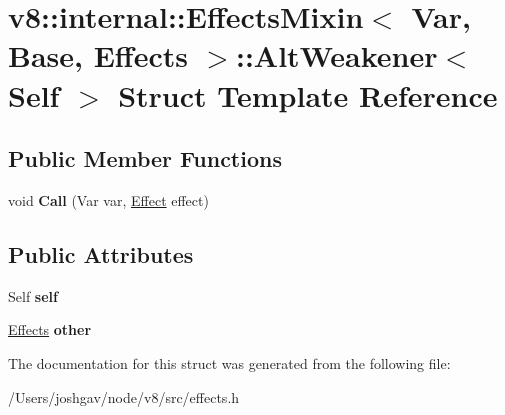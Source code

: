 \hypertarget{structv8_1_1internal_1_1_effects_mixin_1_1_alt_weakener}{}\section{v8\+:\+:internal\+:\+:Effects\+Mixin$<$ Var, Base, Effects $>$\+:\+:Alt\+Weakener$<$ Self $>$ Struct Template Reference}
\label{structv8_1_1internal_1_1_effects_mixin_1_1_alt_weakener}
\subsection*{Public Member Functions}
\begin{DoxyCompactItemize}
\item 
void {\bfseries Call} (Var var, \hyperlink{structv8_1_1internal_1_1_effect}{Effect} effect)\hypertarget{structv8_1_1internal_1_1_effects_mixin_1_1_alt_weakener_a651cd436a421f5b78abc43754e8309a3}{}\label{structv8_1_1internal_1_1_effects_mixin_1_1_alt_weakener_a651cd436a421f5b78abc43754e8309a3}

\end{DoxyCompactItemize}
\subsection*{Public Attributes}
\begin{DoxyCompactItemize}
\item 
Self {\bfseries self}\hypertarget{structv8_1_1internal_1_1_effects_mixin_1_1_alt_weakener_ae73da3655748ec9da62f755efd66633a}{}\label{structv8_1_1internal_1_1_effects_mixin_1_1_alt_weakener_ae73da3655748ec9da62f755efd66633a}

\item 
\hyperlink{classv8_1_1internal_1_1_effects}{Effects} {\bfseries other}\hypertarget{structv8_1_1internal_1_1_effects_mixin_1_1_alt_weakener_adde1918061d0bb8bd6148becfeef5e84}{}\label{structv8_1_1internal_1_1_effects_mixin_1_1_alt_weakener_adde1918061d0bb8bd6148becfeef5e84}

\end{DoxyCompactItemize}


The documentation for this struct was generated from the following file\+:\begin{DoxyCompactItemize}
\item 
/\+Users/joshgav/node/v8/src/effects.\+h\end{DoxyCompactItemize}

